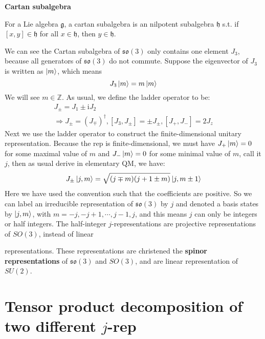\documentclass{article}
\begin{document}
	
	\begin{definition}
		\textbf{Cartan subalgebra}
		
		For a Lie algebra $\mathfrak{g}$, a cartan subalgebra is an nilpotent subalgebra $\mathfrak{h}$ s.t. if $[ x,y] \in \mathfrak{h}$ for all $x\in \mathfrak{h}$, then $y\in \mathfrak{h}$. \ 
	\end{definition}
	We can see the Cartan subalgebra of $\mathfrak{so}( 3)$ only contains one element $J_{3}$, because all generators of $\mathfrak{so}( 3)$ do not commute. Suppose the eigenvector of $J_{3}$ is written as $\ket{m}$, which means
	\begin{equation*}
		J_{3}\ket{m} =m\ket{m}
	\end{equation*}
	We will see $m\in \mathbb{Z}$. As usual, we define the ladder operator to be:
	\begin{gather*}
		J_{\pm } =J_{1} \pm \mathrm{i} J_{2}\\
		\Rightarrow J_{\pm } =( J_{\mp })^{\dagger } ,[ J_{3} ,J_{\pm }] =\pm J_{\pm } ,[ J_{+} ,J_{-}] =2J_{z}
	\end{gather*}
	Next we use the ladder operator to construct the finite-dimensional unitary representation. Because the rep is finite-dimensional, we must have $J_{+}\ket{m} =0$ for some maximal value of $m$ and $J_{-}\ket{m} =0$ for some minimal value of $m$, call it $j$, then as usual derive in elementary QM, we have:
	\begin{equation*}
		J_{\pm }\ket{j,m} =\sqrt{( j\mp m)( j+1\pm m)}\ket{j,m\pm 1}
	\end{equation*}
	Here we have used the convention such that the coefficients are positive. So we can label an irreducible representation of $\mathfrak{so}( 3)$ by $j$ and denoted a basis states by $\ket{j,m}$, with $m=−j,−j+1,\cdots ,j−1,j$, and this means $j$ can only be integers or half integers. The half-integer $j$-representations are projective representations of $SO( 3)$, instead of linear
	
	representations. These representations are christened the \textbf{spinor representations} of $\mathfrak{so}( 3)$ and $SO( 3)$, and are linear representation of $SU( 2)$. 
	
	
	\section{Tensor product decomposition of two different $j$-rep}
	
\end{document}
